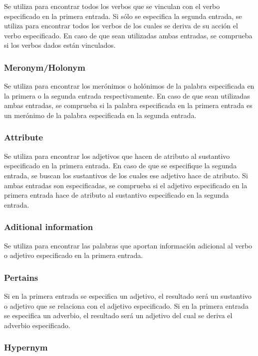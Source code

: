 \documentclass[12pt]{article}
\begin{document}
Se utiliza para encontrar todos los verbos que se vinculan con el verbo especificado en la primera entrada. Si sólo se especifica la segunda entrada, se utiliza para encontrar todos los verbos de los cuales se deriva de su acción el verbo especificado. En caso de que sean utilizadas ambas entradas, se comprueba si los verbos dados están vinculados.

\subsubsection{Meronym/Holonym}

Se utiliza para encontrar los merónimos o holónimos de la palabra especificada en la primera o la segunda entrada respectivamente. En caso de que sean utilizadas ambas entradas, se comprueba si la palabra especificada en la primera entrada es un merónimo de la palabra especificada en la segunda entrada.

\subsubsection{Attribute}

Se utiliza para encontrar los adjetivos que hacen de atributo al sustantivo especificado en la primera entrada. En caso de que se especifique la segunda entrada, se buscan los sustantivos de los cuales ese adjetivo hace de atributo. Si ambas entradas son especificadas, se comprueba si el adjetivo especificado en la primera entrada hace de atributo al sustantivo especificado en la segunda entrada.

\subsubsection{Aditional information}

Se utiliza para encontrar las palabras que aportan información adicional al verbo o adjetivo especificado en la primera entrada.

\subsubsection{Pertains}

Si en la primera entrada se especifica un adjetivo, el resultado será un sustantivo o adjetivo que se relaciona con el adjetivo especificado. Si en la primera entrada se especifica un adverbio, el resultado será un adjetivo del cual se deriva el adverbio especificado.

\subsubsection{Hypernym}
\end{document}
